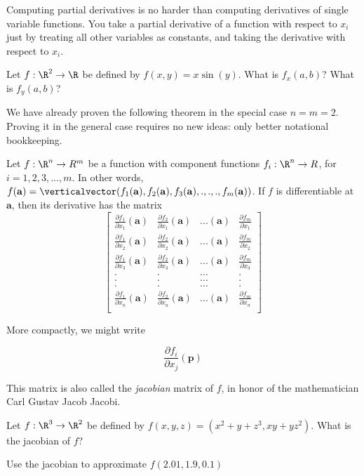 	Computing partial derivatives is no harder than computing derivatives of single variable functions.  You take a 
	 partial derivative of a function with respect to $x_i$ just by treating all other variables as constants, and taking the derivative with respect to $x_i$.
	
	\begin{question}
	Let $f:\R^2 \to \R$ be defined by $f(x,y) = x\sin(y)$.  What is $f_x(a,b)$?  What is $f_y(a,b)$?
	\end{question}
	
	We have already proven the following theorem in the special case $n=m=2$.  Proving it in the general case requires no new ideas: 
	 only better notational bookkeeping.
	
	\begin{theorem}
		Let $f:\R^n \to R^m$ be a function with component functions $f_i:\R^n \to R$, for $i=1,2,3,...,m$.  In other words,
		$f(\mathbf{a}) = \verticalvector(f_1(\mathbf{a}),f_2(\mathbf{a}),f_3(\mathbf{a}),.,.,., f_m(\mathbf{a}))$.  If $f$ is differentiable at $\mathbf{a}$,
		 then its derivative has the matrix 
		  \[
		  \begin{bmatrix}
		  \frac{\partial f_1}{\partial x_1} \left(\mathbf{a}\right) & \frac{\partial f_2}{\partial x_1} \left(\mathbf{a}\right) & ...\left(\mathbf{a}\right) & \frac{\partial f_m}{\partial x_1} \\
		  \frac{\partial f_1}{\partial x_2} \left(\mathbf{a}\right) & \frac{\partial f_2}{\partial x_2} \left(\mathbf{a}\right) & ...\left(\mathbf{a}\right) & \frac{\partial f_m}{\partial x_2} \\
		  \frac{\partial f_1}{\partial x_3} \left(\mathbf{a}\right) & \frac{\partial f_2}{\partial x_3} \left(\mathbf{a}\right) & ...\left(\mathbf{a}\right) & \frac{\partial f_m}{\partial x_3} \\
		    .&.&...&.\\
		    .&.&...&.\\
		    .&.&...&.\\
		 \frac{\partial f_1}{\partial x_n} \left(\mathbf{a}\right) & \frac{\partial f_2}{\partial x_n} \left(\mathbf{a}\right) & ...\left(\mathbf{a}\right) & \frac{\partial f_m}{\partial x_n} \\
		  \end{bmatrix}
		  \]
		  
		  More compactly, we might write
		  
		  \[
		  	\frac{\partial f_i}{\partial x_j} \left( \mathbf{p} \right)
		  \]
		  
		  This matrix is also called the \textit{jacobian} matrix of $f$, in honor of the mathematician Carl Gustav Jacob Jacobi.
	\end{theorem}
	
	\begin{question}
		Let $f:\R^3 \to \R^2$ be defined by $f(x,y,z) = (x^2+y+z^3,xy+yz^2)$.  What is the jacobian of $f$?
		
		Use the jacobian to approximate $f(2.01,1.9,0.1)$
	\end{question}
	
